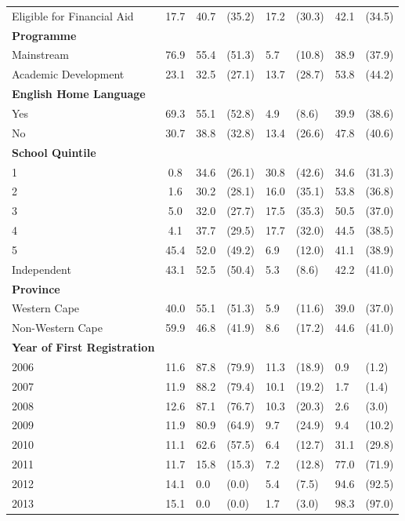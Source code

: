 \begin{longtable}{L{2.5cm}cR{0.9cm}lR{0.9cm}lR{0.9cm}l}
Eligible for Financial Aid & 17.7 & 40.7 & (35.2) & 17.2 & (30.3) & 42.1 & (34.5) \\
\addlinespace
{\bfseries Programme} & & & & & & & \\
Mainstream & 76.9 & 55.4 & (51.3) & 5.7 & (10.8) & 38.9 & (37.9) \\
Academic Development & 23.1 & 32.5 & (27.1) & 13.7 & (28.7) & 53.8 & (44.2) \\
\addlinespace
{\bfseries English Home Language} & & & & & & & \\
Yes & 69.3 & 55.1 & (52.8) & 4.9 & (8.6) & 39.9 & (38.6) \\
No & 30.7 & 38.8 & (32.8) & 13.4 & (26.6) & 47.8 & (40.6) \\
\addlinespace
{\bfseries School Quintile} & & & & & & & \\
1 & 0.8 & 34.6 & (26.1) & 30.8 & (42.6) & 34.6 & (31.3) \\
2 & 1.6 & 30.2 & (28.1) & 16.0 & (35.1) & 53.8 & (36.8) \\
3 & 5.0 & 32.0 & (27.7) & 17.5 & (35.3) & 50.5 & (37.0) \\
4 & 4.1 & 37.7 & (29.5) & 17.7 & (32.0) & 44.5 & (38.5) \\
5 & 45.4 & 52.0 & (49.2) & 6.9 & (12.0) & 41.1 & (38.9) \\
Independent  & 43.1 & 52.5 & (50.4) & 5.3 & (8.6) & 42.2 & (41.0) \\
\addlinespace
{\bfseries Province} & & & & & & & \\
Western Cape & 40.0 & 55.1 & (51.3) &5.9 & (11.6) &39.0 & (37.0) \\
Non-Western Cape & 59.9 & 46.8 & (41.9) & 8.6 & (17.2) & 44.6 & (41.0) \\
\addlinespace
{\bfseries Year of First Registration} & & & & & & & \\
{2006} & 11.6  & 87.8 & (79.9) & 11.3 & (18.9) & 0.9 & (1.2) \\
{2007} & 11.9 & 88.2 & (79.4) & 10.1 & (19.2)   & 1.7 & (1.4) \\
{2008} & 12.6 & 87.1 & (76.7) & 10.3 & (20.3) & 2.6 & (3.0) \\
{2009} & 11.9 & 80.9 & (64.9) & 9.7 & (24.9) & 9.4 & (10.2) \\
{2010} & 11.1 & 62.6 & (57.5) & 6.4 & (12.7) & 31.1 & (29.8) \\
{2011} & 11.7 & 15.8 & (15.3) & 7.2 & (12.8) & 77.0 & (71.9) \\
{2012} & 14.1 & 0.0 & (0.0)  & 5.4 & (7.5) & 94.6 & (92.5) \\
{2013} & 15.1 & 0.0 & (0.0) & 1.7 & (3.0) & 98.3 & (97.0) \\
\end{longtable}

